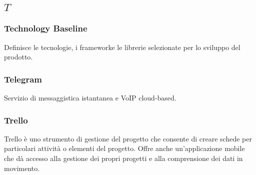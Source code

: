 \subsection*{\quad$T\quad$}
\subsubsection*{Technology Baseline}
Definisce le tecnologie, i framework\glosp e le librerie selezionate per lo sviluppo del prodotto.

\subsubsection*{Telegram}
Servizio di messaggistica istantanea  e VoIP cloud-based.

\subsubsection*{Trello}
Trello è uno strumento di gestione del progetto che consente di creare schede per particolari attività o elementi del progetto. Offre anche un'applicazione mobile che dà accesso alla gestione dei propri progetti e alla comprensione dei dati in movimento. 
